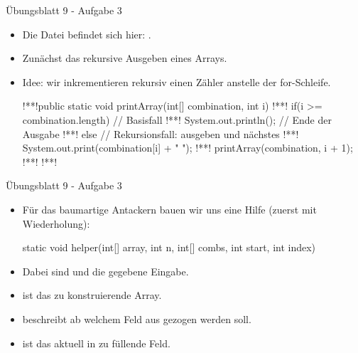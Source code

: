 \iffull{}\fi
\begin{frame}[fragile]{Übungsblatt 9 - Aufgabe 3}
    \begin{itemize}[<+(1)->]
        \itemsep6pt
        \item Die Datei befindet sich hier: .
        \item Zunächst das rekursive Ausgeben eines Arrays.
        \item Idee: wir inkrementieren rekursiv einen Zähler anstelle der for-Schleife.\vfill
\begin{plainjava}
!**!public static void printArray(int[] combination, int i) {
!**!    if(i >= combination.length) { // Basisfall
!**!        System.out.println(); // Ende der Ausgabe
!**!    } else { // Rekursionsfall: ausgeben und nächstes
!**!        System.out.print(combination[i] + " ");
!**!        printArray(combination, i + 1);
!**!    }
!**!}
\end{plainjava}
\vfill\null
    \end{itemize}
\iffull{}\fi
\end{frame}

\begin{frame}[fragile]{Übungsblatt 9 - Aufgabe 3}
    \begin{itemize}[<+(1)->]
        \itemsep6pt
        \item Für das baumartige Antackern bauen wir uns eine Hilfe (zuerst mit Wiederholung):\pause
\begin{plainjava}
static void helper(int[] array, int n, int[] combs, int start, int index)
\end{plainjava}
        \item Dabei sind  und  die gegebene Eingabe.
        \item {} ist das zu konstruierende Array.
        \item {} beschreibt ab welchem Feld aus  gezogen werden soll.
        \item {} ist das aktuell in  zu füllende Feld.
    \end{itemize}
\end{frame}

